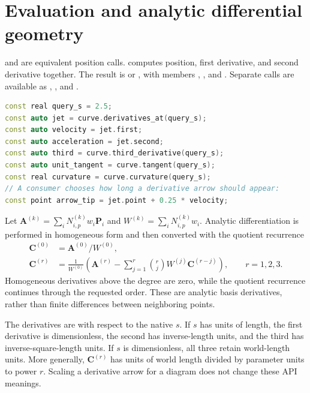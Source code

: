 \section{Evaluation and analytic differential geometry}
\label{sec:spline-derivatives}

 and  are equivalent position calls.
 computes position, first derivative, and second
derivative together. The result is  or
, with members , , and
. Separate calls are available as ,
, and .

\begin{lstlisting}[language=C++,caption={Position, derivatives, tangent, and curvature.}]
const real query_s = 2.5;
const auto jet = curve.derivatives_at(query_s);
const auto velocity = jet.first;
const auto acceleration = jet.second;
const auto third = curve.third_derivative(query_s);
const auto unit_tangent = curve.tangent(query_s);
const real curvature = curve.curvature(query_s);
// A consumer chooses how long a derivative arrow should appear:
const point arrow_tip = jet.point + 0.25 * velocity;
\end{lstlisting}

Let $\mathbf A^{(k)}=\sum_i N_{i,p}^{(k)}w_i\mathbf P_i$ and
$W^{(k)}=\sum_i N_{i,p}^{(k)}w_i$. Analytic differentiation is performed in
homogeneous form and then converted with the quotient recurrence
\begin{align}
\mathbf C^{(0)}&=\mathbf A^{(0)}/W^{(0)},\\
\mathbf C^{(r)}&=\frac{1}{W^{(0)}}\left(
 \mathbf A^{(r)}-\sum_{j=1}^{r}\binom rj
 W^{(j)}\mathbf C^{(r-j)}\right),\qquad r=1,2,3.
\label{eq:spline-quotient}
\end{align}
Homogeneous derivatives above the degree are zero, while the quotient
recurrence continues through the requested order. These are analytic basis
derivatives, rather than finite differences between neighboring points.

The derivatives are with respect to the native $s$. If $s$ has units of length,
the first derivative is dimensionless, the second has inverse-length units,
and the third has inverse-square-length units. If $s$ is dimensionless,
all three retain world-length units. More generally,
$\mathbf C^{(r)}$ has units of world length divided by parameter units to
power $r$. Scaling a derivative arrow for a diagram does not change these
API meanings.

